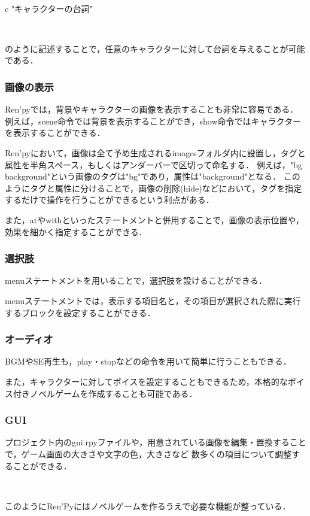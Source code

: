     ~

    c "キャラクターの台詞"

    ~

    のように記述することで，任意のキャラクターに対して台詞を与えることが可能である．

  \subsubsection{画像の表示}

    Ren'pyでは，背景やキャラクターの画像を表示することも非常に容易である．
    例えば，scene命令では背景を表示することができ，show命令ではキャラクターを表示することができる．

    Ren'pyにおいて，画像は全て予め生成されるimagesフォルダ内に設置し，タグと属性を半角スペース，もしくはアンダーバーで区切って命名する．
    例えば，"bg background"という画像のタグは"bg"であり，属性は"background"となる．
    このようにタグと属性に分けることで，画像の削除(hide)などにおいて，タグを指定するだけで操作を行うことができるという利点がある．

    また，atやwithといったステートメントと併用することで，画像の表示位置や，効果を細かく指定することができる．

  \subsubsection{選択肢}

    menuステートメントを用いることで，選択肢を設けることができる．
    
    menuステートメントでは，表示する項目名と，その項目が選択された際に実行するブロックを設定することができる．

  \subsubsection{オーディオ}

    BGMやSE再生も，play・stopなどの命令を用いて簡単に行うこともできる．

    また，キャラクターに対してボイスを設定することもできるため，本格的なボイス付きノベルゲームを作成することも可能である．

  \subsubsection{GUI}

    プロジェクト内のgui.rpyファイルや，用意されている画像を編集・置換することで，ゲーム画面の大きさや文字の色，大きさなど
    数多くの項目について調整することができる．

  ~

  このようにRen'Pyにはノベルゲームを作るうえで必要な機能が整っている．

